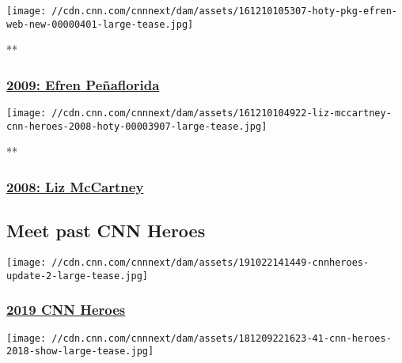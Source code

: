 \href{/videos/world/2017/03/24/cnnheroes-update-2009-hero-of-the-year-efren-penaflorida.cnn}{}

\texttt{[image: //cdn.cnn.com/cnnnext/dam/assets/161210105307-hoty-pkg-efren-web-new-00000401-large-tease.jpg]}

**

\hypertarget{2009-efren-peuxf1aflorida}{%
\subsubsection{\texorpdfstring{\href{/videos/world/2017/03/24/cnnheroes-update-2009-hero-of-the-year-efren-penaflorida.cnn}{2009:
Efren
Peñaflorida}}{2009: Efren Peñaflorida}}\label{2009-efren-peuxf1aflorida}}

\href{/videos/us/2017/03/23/cnnheroes-2008-update-hero-of-the-year-liz-mccartney.cnn}{}

\texttt{[image: //cdn.cnn.com/cnnnext/dam/assets/161210104922-liz-mccartney-cnn-heroes-2008-hoty-00003907-large-tease.jpg]}

**

\hypertarget{2008-liz-mccartney}{%
\subsubsection{\texorpdfstring{\href{/videos/us/2017/03/23/cnnheroes-2008-update-hero-of-the-year-liz-mccartney.cnn}{2008:
Liz McCartney}}{2008: Liz McCartney}}\label{2008-liz-mccartney}}

\hypertarget{meet-past-cnn-heroes}{%
\subsection{Meet past CNN Heroes}\label{meet-past-cnn-heroes}}

\href{http://www.cnn.com/specials/cnn-heroes-2019-archive}{}

\texttt{[image: //cdn.cnn.com/cnnnext/dam/assets/191022141449-cnnheroes-update-2-large-tease.jpg]}

\hypertarget{2019-cnn-heroes}{%
\subsubsection{\texorpdfstring{\href{http://www.cnn.com/specials/cnn-heroes-2019-archive}{2019
CNN Heroes}}{2019 CNN Heroes}}\label{2019-cnn-heroes}}

\href{http://www.cnn.com/specials/cnn-heroes-2018-archive}{}

\texttt{[image: //cdn.cnn.com/cnnnext/dam/assets/181209221623-41-cnn-heroes-2018-show-large-tease.jpg]}

